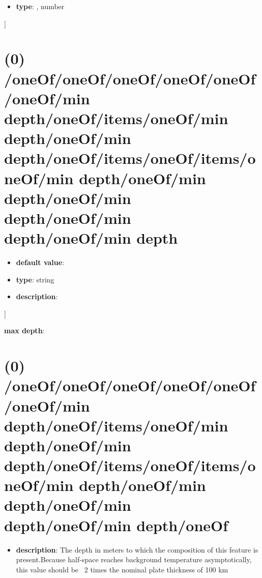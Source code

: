 \begin{itemize}[leftmargin=5em]\item {\bf type}: , number\end{itemize}]\section{(0) /oneOf/oneOf/oneOf/oneOf/oneOf/oneOf/min depth/oneOf/items/oneOf/min depth/oneOf/min depth/oneOf/items/oneOf/items/oneOf/min depth/oneOf/min depth/oneOf/min depth/oneOf/min depth/oneOf/min depth}
\begin{itemize}[leftmargin=0em]\item {\bf default value}: 
\item {\bf type}: string
\item {\bf description}: 
\end{itemize}]\item {\bf max depth}: \section{(0) /oneOf/oneOf/oneOf/oneOf/oneOf/oneOf/min depth/oneOf/items/oneOf/min depth/oneOf/min depth/oneOf/items/oneOf/items/oneOf/min depth/oneOf/min depth/oneOf/min depth/oneOf/min depth/oneOf}
\begin{itemize}[leftmargin=0em]\item {\bf description}: The depth in meters to which the composition of this feature is present.Because half-space reaches background temperature asymptotically, this value should be ~2 times the nominal plate thickness of 100 km
\end{itemize}
